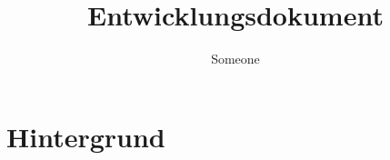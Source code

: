 \documentclass[11pt, a4paper]{article}
\title{Entwicklungsdokument}
\author{Someone}
\begin{document}
    
\maketitle

\clearpage

\tableofcontents

\clearpage

\section{Hintergrund}
\end{document}
